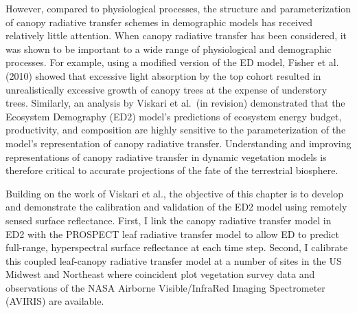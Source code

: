 However, compared to physiological processes, the structure and parameterization of canopy radiative transfer schemes in demographic models has received relatively little attention.
When canopy radiative transfer has been considered, it was shown to be important to a wide range of physiological and demographic processes.
For example, using a modified version of the ED model, Fisher et al. (2010)\nocite{fisher_2010_assessing} showed that excessive light absorption by the top cohort resulted in unrealistically excessive growth of canopy trees at the expense of understory trees.
Similarly, an analysis by Viskari et al.\ (in revision) \nocite{viskari_2019_influence} demonstrated that the Ecosystem Demography (ED2) model's predictions of ecosystem energy budget, productivity, and composition are highly sensitive to the parameterization of the model's representation of canopy radiative transfer.
Understanding and improving representations of canopy radiative transfer in dynamic vegetation models is therefore critical to accurate projections of the fate of the terrestrial biosphere.

Building on the work of Viskari et al., the objective of this chapter is to develop and demonstrate the calibration and validation of the ED2 model using remotely sensed surface reflectance.
First, I link the canopy radiative transfer model in ED2 with the PROSPECT leaf radiative transfer model to allow ED to predict full-range, hyperspectral surface reflectance at each time step.
Second, I calibrate this coupled leaf-canopy radiative transfer model at a number of sites in the US Midwest and Northeast where coincident plot vegetation survey data and observations of the NASA Airborne Visible/InfraRed Imaging Spectrometer (AVIRIS) are available.
